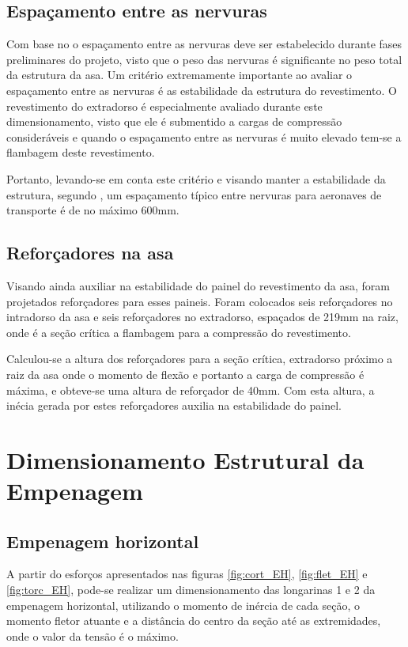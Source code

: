 \subsection{Espaçamento entre as nervuras}
Com base no \cite{niu1999airframe} o espaçamento entre as nervuras deve ser estabelecido durante fases preliminares do projeto, visto que o peso das nervuras é significante no peso total da estrutura da asa. Um critério extremamente importante ao avaliar o espaçamento entre as nervuras é as estabilidade da estrutura do revestimento. O revestimento do extradorso é especialmente avaliado durante este dimensionamento, visto que ele é submentido a cargas de compressão consideráveis e quando o espaçamento entre as nervuras é muito elevado tem-se a flambagem deste revestimento.

Portanto, levando-se em conta este critério e visando manter a estabilidade da estrutura, segundo \cite{roskam}, um espaçamento típico entre nervuras para aeronaves de transporte é de no máximo 600mm.

\subsection{Reforçadores na asa}
Visando ainda auxiliar na estabilidade do painel do revestimento da asa, foram projetados reforçadores para esses paineis. Foram colocados seis reforçadores no intradorso da asa e seis reforçadores no extradorso, espaçados de 219mm na raiz, onde é a seção crítica a flambagem para a compressão do revestimento.

Calculou-se a altura dos reforçadores para a seção crítica, extradorso próximo a raiz da asa onde o momento de flexão e portanto a carga de compressão é máxima, e obteve-se uma altura de reforçador de 40mm. Com esta altura, a inécia gerada por estes reforçadores auxilia na estabilidade do painel.



\section{Dimensionamento Estrutural da Empenagem}

\subsection{Empenagem horizontal}
A partir do esforços apresentados nas figuras \ref{fig:cort_EH}, \ref{fig:flet_EH} e \ref{fig:torc_EH}, pode-se realizar um dimensionamento das longarinas 1 e 2 da empenagem horizontal, utilizando o momento de inércia de cada seção, o momento fletor atuante e a distância do centro da seção até as extremidades, onde o valor da tensão é o máximo.

